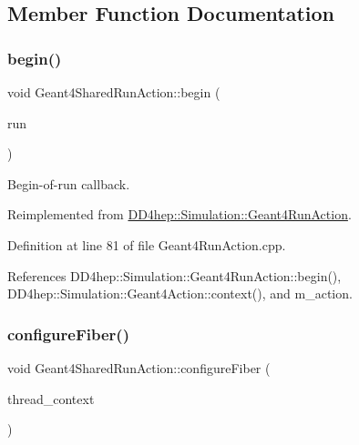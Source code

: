 \subsection{Member Function Documentation}
\hypertarget{class_d_d4hep_1_1_simulation_1_1_geant4_shared_run_action_a8206dc20bbe8ace921f4e97c7159872a}{}\label{class_d_d4hep_1_1_simulation_1_1_geant4_shared_run_action_a8206dc20bbe8ace921f4e97c7159872a} 
\subsubsection{\texorpdfstring{begin()}{begin()}}
{\footnotesize\ttfamily void Geant4\+Shared\+Run\+Action\+::begin (\begin{DoxyParamCaption}\item[{const G4\+Run $\ast$}]{run }\end{DoxyParamCaption})\hspace{0.3cm}{\ttfamily [virtual]}}



Begin-\/of-\/run callback. 



Reimplemented from \hyperlink{class_d_d4hep_1_1_simulation_1_1_geant4_run_action_aeea4684e5d27e039b26734c3dbf3f65b}{D\+D4hep\+::\+Simulation\+::\+Geant4\+Run\+Action}.



Definition at line 81 of file Geant4\+Run\+Action.\+cpp.



References D\+D4hep\+::\+Simulation\+::\+Geant4\+Run\+Action\+::begin(), D\+D4hep\+::\+Simulation\+::\+Geant4\+Action\+::context(), and m\+\_\+action.

\hypertarget{class_d_d4hep_1_1_simulation_1_1_geant4_shared_run_action_a6077a3ce7deb655ef76d4fe4e8dc1b19}{}\label{class_d_d4hep_1_1_simulation_1_1_geant4_shared_run_action_a6077a3ce7deb655ef76d4fe4e8dc1b19} 
\subsubsection{\texorpdfstring{configure\+Fiber()}{configureFiber()}}
{\footnotesize\ttfamily void Geant4\+Shared\+Run\+Action\+::configure\+Fiber (\begin{DoxyParamCaption}\item[{\hyperlink{class_d_d4hep_1_1_simulation_1_1_geant4_context}{Geant4\+Context} $\ast$}]{thread\+\_\+context }\end{DoxyParamCaption})\hspace{0.3cm}{\ttfamily [virtual]}}



